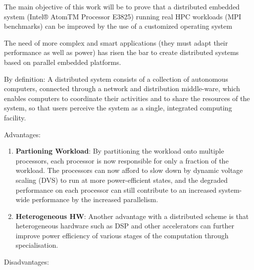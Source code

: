 The main objective of this work will be to prove that a distributed embedded
system (Intel® AtomTM Processor E3825) running real HPC workloads 
(MPI benchmarks) can be improved by the use of a customized operating system 



The need of more complex and smart applications (they must adapt their
performance as well as power) has risen the bar to create distributed systems
based on parallel embedded platforms. 

By definition: A distributed system consists of a collection of autonomous
computers, connected through a network and distribution middle-ware, which
enables computers to coordinate their activities and to share the resources of
the system, so that users perceive the system as a single, integrated computing
facility.

Advantages: 

\begin{enumerate} 
    
    \item \textbf{Partioning Workload}: 
    By partitioning the workload onto multiple processors, 
    each processor is now responsible for only a fraction of the workload. 
    The processors can now afford to slow down by dynamic voltage scaling 
    (DVS) to run at more power-efficient states, and the degraded performance 
    on each processor can still contribute to an increased system-wide 
    performance by the increased parallelism.  

    \item \textbf{Heterogeneous HW}: 
    Another advantage with a distributed scheme is that heterogeneous hardware 
    such as DSP and other accelerators can further improve power efficiency 
    of various stages of the computation through specialisation.

\end{enumerate}
 

Disadvantages: 

